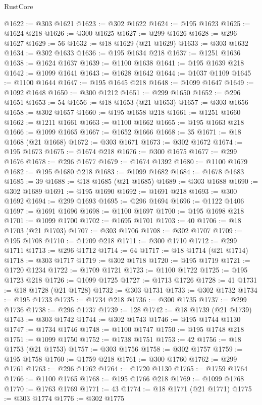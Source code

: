 \begin{lexlean}{RustCore}
\begin{coremodule}
@1622 := @303 @1621
@1623 := @302 @1622
@1624 := @195 @1623
@1625 := @1624 @218
@1626 := @300 @1625
@1627 := @299 @1626
@1628 := @296 @1627
@1629 := 56
@1632 := @18 @1629 (@21 @1629)
@1633 := @303 @1632
@1634 := @302 @1633
@1636 := @195 @1634 @218
@1637 := @1251 @1636
@1638 := @1624 @1637
@1639 := @1100 @1638
@1641 := @195 @1639 @218
@1642 := @1099 @1641
@1643 := @1628 @1642
@1644 := @1037 @1109
@1645 := @1100 @1644
@1647 := @195 @1645 @218
@1648 := @1099 @1647
@1649 := @1092 @1648
@1650 := @300 @1212
@1651 := @299 @1650
@1652 := @296 @1651
@1653 := 54
@1656 := @18 @1653 (@21 @1653)
@1657 := @303 @1656
@1658 := @302 @1657
@1660 := @195 @1658 @218
@1661 := @1251 @1660
@1662 := @1211 @1661
@1663 := @1100 @1662
@1665 := @195 @1663 @218
@1666 := @1099 @1665
@1667 := @1652 @1666
@1668 := 35
@1671 := @18 @1668 (@21 @1668)
@1672 := @303 @1671
@1673 := @302 @1672
@1674 := @195 @1673
@1675 := @1674 @218
@1676 := @300 @1675
@1677 := @299 @1676
@1678 := @296 @1677
@1679 := @1674 @1392
@1680 := @1100 @1679
@1682 := @195 @1680 @218
@1683 := @1099 @1682
@1684 := @1678 @1683
@1685 := 39
@1688 := @18 @1685 (@21 @1685)
@1689 := @303 @1688
@1690 := @302 @1689
@1691 := @195 @1690
@1692 := @1691 @218
@1693 := @300 @1692
@1694 := @299 @1693
@1695 := @296 @1694
@1696 := @1122 @1406
@1697 := @1691 @1696
@1698 := @1100 @1697
@1700 := @195 @1698 @218
@1701 := @1099 @1700
@1702 := @1695 @1701
@1703 := 40
@1706 := @18 @1703 (@21 @1703)
@1707 := @303 @1706
@1708 := @302 @1707
@1709 := @195 @1708
@1710 := @1709 @218
@1711 := @300 @1710
@1712 := @299 @1711
@1713 := @296 @1712
@1714 := 64
@1717 := @18 @1714 (@21 @1714)
@1718 := @303 @1717
@1719 := @302 @1718
@1720 := @195 @1719
@1721 := @1720 @1234
@1722 := @1709 @1721
@1723 := @1100 @1722
@1725 := @195 @1723 @218
@1726 := @1099 @1725
@1727 := @1713 @1726
@1728 := 41
@1731 := @18 @1728 (@21 @1728)
@1732 := @303 @1731
@1733 := @302 @1732
@1734 := @195 @1733
@1735 := @1734 @218
@1736 := @300 @1735
@1737 := @299 @1736
@1738 := @296 @1737
@1739 := 128
@1742 := @18 @1739 (@21 @1739)
@1743 := @303 @1742
@1744 := @302 @1743
@1746 := @195 @1744 @1130
@1747 := @1734 @1746
@1748 := @1100 @1747
@1750 := @195 @1748 @218
@1751 := @1099 @1750
@1752 := @1738 @1751
@1753 := 42
@1756 := @18 @1753 (@21 @1753)
@1757 := @303 @1756
@1758 := @302 @1757
@1759 := @195 @1758
@1760 := @1759 @218
@1761 := @300 @1760
@1762 := @299 @1761
@1763 := @296 @1762
@1764 := @1720 @1130
@1765 := @1759 @1764
@1766 := @1100 @1765
@1768 := @195 @1766 @218
@1769 := @1099 @1768
@1770 := @1763 @1769
@1771 := 43
@1774 := @18 @1771 (@21 @1771)
@1775 := @303 @1774
@1776 := @302 @1775

\end{coremodule}
\end{lexlean}
